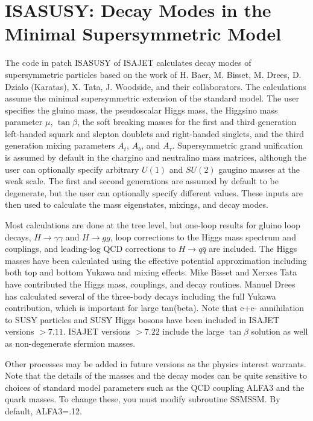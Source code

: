 \newpage
\section{ISASUSY: Decay Modes in the Minimal Supersymmetric
Model\label{SUSY}}

      The code in patch ISASUSY of ISAJET calculates decay modes of
supersymmetric particles based on the work of H. Baer, M. Bisset, M.
Drees, D. Dzialo (Karatas), X. Tata, J. Woodside, and their
collaborators. The calculations assume the minimal supersymmetric
extension of the standard model. The user specifies the gluino mass,
the pseudoscalar Higgs mass, the Higgsino mass parameter $\mu$,
$\tan\beta$, the soft breaking masses for the first and third
generation left-handed squark and slepton doublets and right-handed
singlets, and the third generation mixing parameters $A_t$, $A_b$, and
$A_\tau$.  Supersymmetric grand unification is assumed by default in
the chargino and neutralino mass matrices, although the user can
optionally specify arbitrary $U(1)$ and $SU(2)$ gaugino masses at the
weak scale. The first and second generations are assumed by default to
be degenerate, but the user can optionally specify different values.
These inputs are then used to calculate the mass eigenstates, mixings,
and decay modes.

      Most calculations are done at the tree level, but one-loop
results for gluino loop decays, $H \to \gamma\gamma$ and $H \to gg$, loop
corrections to the Higgs mass spectrum and couplings, and leading-log
QCD corrections to $H \to q \bar q$ are included. The Higgs masses have
been calculated using the effective potential approximation including
both top and bottom Yukawa and mixing effects. Mike Bisset and Xerxes
Tata have contributed the Higgs mass, couplings, and decay routines.
Manuel Drees has calculated several of the three-body decays including
the full Yukawa contribution, which is important for large tan(beta).
Note that e+e- annihilation to SUSY particles and SUSY Higgs bosons
have been included in ISAJET versions $>7.11$. ISAJET versions $>7.22$
include the large $\tan\beta$ solution as well as non-degenerate
sfermion masses.

Other processes may be added in future versions as the physics 
interest warrants. Note that
the details of the masses and the decay modes can be quite sensitive
to choices of standard model parameters such as the QCD coupling ALFA3
and the quark masses.  To change these, you must modify subroutine
SSMSSM. By default, ALFA3=.12.

